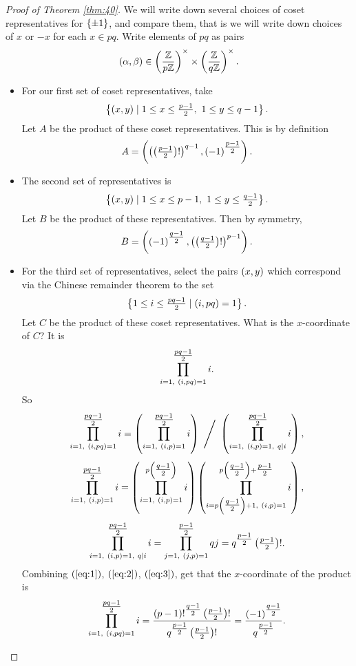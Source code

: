 \begin{proof}[Proof of Theorem \ref{thm:40}]
We will write down several choices of coset representatives for $ \left\{ \pm 1 \right\} $, and compare them, that is we will write down choices of $ x $ or $ -x $ for each $ x \in \unit{pq} $. Write elements of $ \unit{pq} $ as pairs
$$ \left( \alpha, \beta \right) \in \left( \dfrac{\mathbb{Z}}{p\mathbb{Z}} \right)^\times \times \left( \dfrac{\mathbb{Z}}{q\mathbb{Z}} \right)^\times. $$
\begin{itemize}
\item For our first set of coset representatives, take
$$ \left\{ \left( x, y \right) \mid 1 \le x \le \tfrac{p - 1}{2}, \ 1 \le y \le q - 1 \right\}. $$
Let $ A $ be the product of these coset representatives. This is by definition
$$ A = \left( \left( \left( \tfrac{p - 1}{2} \right)! \right)^{q - 1}, \left( -1 \right)^{\tfrac{p - 1}{2}} \right). $$
\item The second set of representatives is
$$ \left\{ \left( x, y \right) \mid 1 \le x \le p - 1, \ 1 \le y \le \tfrac{q - 1}{2} \right\}. $$
Let $ B $ be the product of these representatives. Then by symmetry,
$$ B = \left( \left( -1 \right)^{\tfrac{q - 1}{2}}, \left( \left( \tfrac{q - 1}{2} \right)! \right)^{p - 1} \right). $$
\item For the third set of representatives, select the pairs $ \left( x, y \right) $ which correspond via the Chinese remainder theorem to the set
$$ \left\{ 1 \le i \le \tfrac{pq - 1}{2} \mid \left( i, pq \right) = 1 \right\}. $$
Let $ C $ be the product of these coset representatives. What is the $ x $-coordinate of $ C $? It is
$$ \prod_{i = 1, \ \left( i, pq \right) = 1}^{\tfrac{pq - 1}{2}} i. $$
So
\begin{equation}
\label{eq:1}
\prod_{i = 1, \ \left( i, pq \right) = 1}^{\tfrac{pq - 1}{2}} i = \left( \prod_{i = 1, \ \left( i, p \right) = 1}^{\tfrac{pq - 1}{2}} i \right) \ \Bigg/ \ \left( \prod_{i = 1, \ \left( i, p \right) = 1, \ q \mid i}^{\tfrac{pq - 1}{2}} i \right),
\end{equation}
\begin{equation}
\label{eq:2}
\prod_{i = 1, \ \left( i, p \right) = 1}^{\tfrac{pq - 1}{2}} i = \left( \prod_{i = 1, \ \left( i, p \right) = 1}^{p\left( \tfrac{q - 1}{2} \right)} i \right)\left( \prod_{i = p\left( \tfrac{q - 1}{2} \right) + 1, \ \left( i, p \right) = 1}^{p\left( \tfrac{q - 1}{2} \right) + \tfrac{p - 1}{2}} i \right),
\end{equation}
\begin{equation}
\label{eq:3}
\prod_{i = 1, \ \left( i, p \right) = 1, \ q \mid i}^{\tfrac{pq - 1}{2}} i = \prod_{j = 1, \ \left( j, p \right) = 1}^{\tfrac{p - 1}{2}} qj = q^{\tfrac{p - 1}{2}}\left( \tfrac{p - 1}{2} \right)!.
\end{equation}
Combining $ \left( \ref{eq:1} \right) $, $ \left( \ref{eq:2} \right) $, $ \left( \ref{eq:3} \right) $, get that the $ x $-coordinate of the product is
$$ \prod_{i = 1, \ \left( i, pq \right) = 1}^{\tfrac{pq - 1}{2}} i = \dfrac{\left( p - 1 \right)!^{\tfrac{q - 1}{2}}\left( \tfrac{p - 1}{2} \right)!}{q^{\tfrac{p - 1}{2}}\left( \tfrac{p - 1}{2} \right)!} = \dfrac{\left( -1 \right)^{\tfrac{q - 1}{2}}}{q^{\tfrac{p - 1}{2}}}. $$

\end{itemize}
\end{proof}
